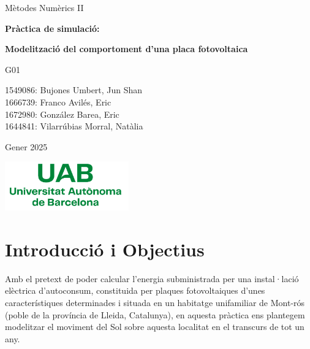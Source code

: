\documentclass[10pt, twoside, a4paper]{article}
\begin{document}
\begin{titlepage}
\centering
{\LARGE Mètodes Numèrics II \par}
\vspace{2cm}
{\Huge \textbf{Pràctica de simulació:} \par}
\vspace{1cm}
{\Huge \textbf{Modelització del comportoment d'una placa fotovoltaica} \par}
\vspace{3cm}
{\Large G01 \par}
\vspace{0.5cm}
{\Large 1549086: Bujones Umbert, Jun Shan\\1666739: Franco Avilés, Eric\\  1672980: González Barea, Eric\\1644841: Vilarrúbias Morral, Natàlia \par}
\vspace{2cm}
{\Large Gener 2025 \par}
\vspace{2cm}
\includegraphics[width=0.4\textwidth]{Logo_UAB.png}


\end{titlepage}

\renewcommand{\cftsecfont}{}
\renewcommand{\cftsecpagefont}{}
\renewcommand{\cftsecleader}{\cftdotfill{\cftdotsep}}
\renewcommand{\cftdotsep}{0.2}
\setlength{\cftbeforesecskip}{0.5em}
\setlength{\cftbeforesubsecskip}{0.5em}
\tableofcontents

\newpage
{}
\setcounter{page}{1}

\pagestyle{fancy}

\section{Introducció i Objectius}
Amb el pretext de poder calcular l'energia subministrada per una instal·lació elèctrica d'autoconsum, constituida per plaques fotovoltaiques d'unes característiques determinades i situada en un habitatge unifamiliar de Mont-rós (poble de la província de Lleida, Catalunya), en aquesta pràctica ens plantegem modelitzar el moviment del Sol sobre aquesta localitat en el transcurs de tot un any. 
\end{document}
